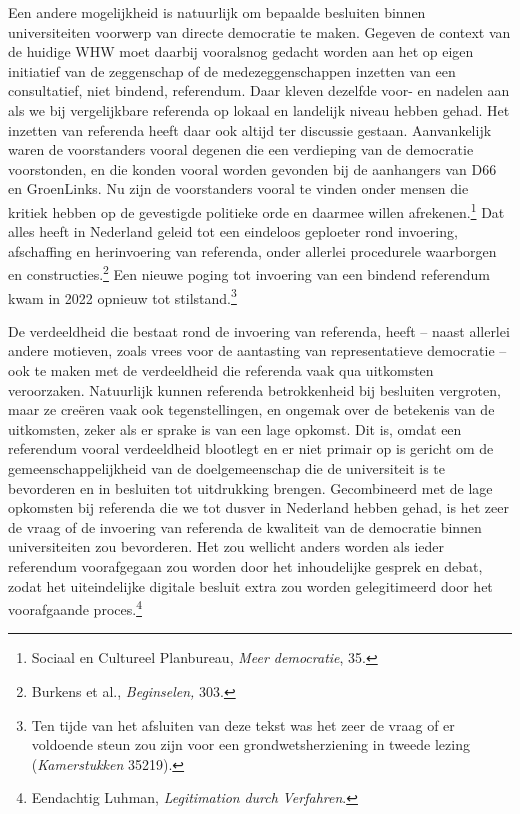 \documentclass[smallauthor, chapterhaspagenum, nochapterinheader, pagenuminheader,  bigchapnum,medium2, tocpages, garamond, titleinheader]{jote-book}
\begin{document}
	Een andere mogelijkheid is natuurlijk om bepaalde besluiten binnen universiteiten voorwerp van directe democratie te maken. Gegeven de context van de huidige WHW moet daarbij vooralsnog gedacht worden aan het op eigen initiatief van de zeggenschap of de medezeggenschappen inzetten van een consultatief, niet bindend, referendum. Daar kleven dezelfde voor- en nadelen aan als we bij vergelijkbare referenda op lokaal en landelijk niveau hebben gehad. Het inzetten van referenda heeft daar ook altijd ter discussie gestaan. Aanvankelijk waren de voorstanders vooral degenen die een verdieping van de democratie voorstonden, en die konden vooral worden gevonden bij de aanhangers van D66 en GroenLinks. Nu zijn de voorstanders vooral te vinden onder mensen die kritiek hebben op de gevestigde politieke orde en daarmee willen afrekenen.\footnote{Sociaal en Cultureel Planbureau, \emph{Meer democratie}, 35. } Dat alles heeft in Nederland geleid tot een eindeloos geploeter rond invoering, afschaffing en herinvoering van referenda, onder allerlei procedurele waarborgen en constructies.\footnote{Burkens et al., \emph{Beginselen, }303.} Een nieuwe poging tot invoering van een bindend referendum kwam in 2022 opnieuw tot stilstand.\footnote{Ten tijde van het afsluiten van deze tekst was het zeer de vraag of er voldoende steun zou zijn voor een grondwetsherziening in tweede lezing (\emph{Kamerstukken} 35219).}



	De verdeeldheid die bestaat rond de invoering van referenda, heeft -- naast allerlei andere motieven, zoals vrees voor de aantasting van representatieve democratie -- ook te maken met de verdeeldheid die referenda vaak qua uitkomsten veroorzaken. Natuurlijk kunnen referenda betrokkenheid bij besluiten vergroten, maar ze creëren vaak ook tegenstellingen, en ongemak over de betekenis van de uitkomsten, zeker als er sprake is van een lage opkomst. Dit is, omdat een referendum vooral verdeeldheid blootlegt en er niet primair op is gericht om de gemeenschappelijkheid van de doelgemeenschap die de universiteit is te bevorderen en in besluiten tot uitdrukking brengen. Gecombineerd met de lage opkomsten bij referenda die we tot dusver in Nederland hebben gehad, is het zeer de vraag of de invoering van referenda de kwaliteit van de democratie binnen universiteiten zou bevorderen. Het zou wellicht anders worden als ieder referendum voorafgegaan zou worden door het inhoudelijke gesprek en debat, zodat het uiteindelijke digitale besluit extra zou worden gelegitimeerd door het voorafgaande proces.\footnote{Eendachtig Luhman, \emph{Legitimation}\emph{ }\emph{durch}\emph{ }\emph{Verfahren}.}
\end{document}
